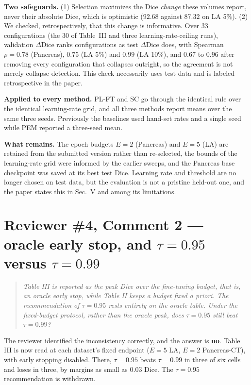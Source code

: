 \documentclass[11pt,a4paper]{article}
\newenvironment{reviewer}{\begin{quote}\itshape\small}{\end{quote}}
\begin{document}
\textbf{Two safeguards.} (1) Selection maximizes the Dice \emph{change} these volumes report, never their absolute Dice, which is optimistic ($92.68$ against $87.32$ on LA 5\%). (2) We checked, retrospectively, that this change is informative. Over 33 configurations (the 30 of Table~III and three learning-rate-ceiling runs), validation $\Delta$Dice ranks configurations as test $\Delta$Dice does, with Spearman $\rho = 0.78$ (Pancreas), $0.75$ (LA 5\%) and $0.99$ (LA 10\%), and $0.67$ to $0.96$ after removing every configuration that collapses outright, so the agreement is not merely collapse detection. This check necessarily uses test data and is labeled retrospective in the paper.

\textbf{Applied to every method.} PL-FT and SC go through the identical rule over the identical learning-rate grid, and all three methods report means over the same three seeds. Previously the baselines used hand-set rates and a single seed while PEM reported a three-seed mean.

\textbf{What remains.} The epoch budgets $E=2$ (Pancreas) and $E=5$ (LA) are retained from the submitted version rather than re-selected, the bounds of the learning-rate grid were informed by the earlier sweeps, and the Pancreas base checkpoint was saved at its best test Dice. Learning rate and threshold are no longer chosen on test data, but the evaluation is not a pristine held-out one, and the paper states this in Sec.~V and among its limitations.

\section*{Reviewer \#4, Comment 2 --- oracle early stop, and $\tau=0.95$ versus $\tau=0.99$}

\begin{reviewer}
Table III is reported as the peak Dice over the fine-tuning budget, that is, an oracle early stop, while Table II keeps a budget fixed a priori. The recommendation of $\tau=0.95$ rests entirely on the oracle table. Under the fixed-budget protocol, rather than the oracle peak, does $\tau=0.95$ still beat $\tau=0.99$?
\end{reviewer}

The reviewer identified the inconsistency correctly, and the answer is \textbf{no}. Table III is now read at each dataset's fixed endpoint ($E=5$ LA, $E=2$ Pancreas-CT), with early stopping disabled. There, $\tau=0.95$ beats $\tau=0.99$ in three of six cells and loses in three, by margins as small as $0.03$ Dice. The $\tau=0.95$ recommendation is withdrawn.
\end{document}
